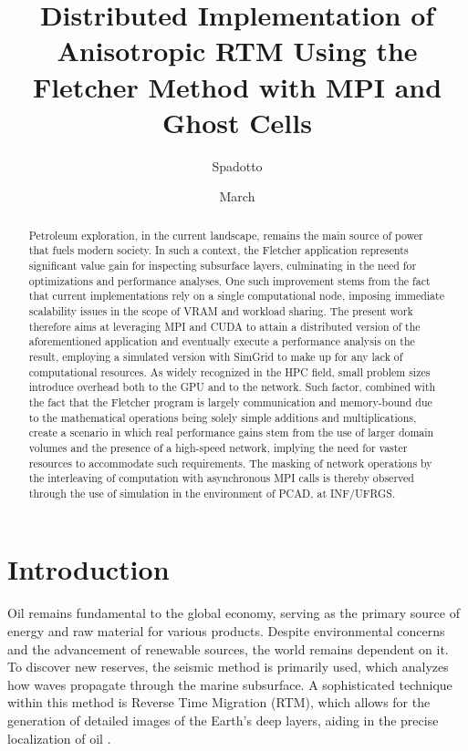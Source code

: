 \documentclass[cic,tc,english]{infufrgs}
\title{Distributed Implementation of Anisotropic RTM Using the
Fletcher Method with MPI and Ghost Cells}
\author{Spadotto}{Vinícius Daniel}
\date{March}{2026}
\begin{document}
\maketitle
\begin{abstract}
  Petroleum exploration, in the current landscape, remains the main source of
  power that fuels modern society. In such a context, the Fletcher application
  represents significant value gain for inspecting subsurface layers,
  culminating
  in the need for optimizations and performance analyses. One such improvement
  stems from the fact that current implementations rely on a single
  computational
  node, imposing immediate scalability issues in the scope of VRAM and workload
  sharing. The present work therefore aims at leveraging MPI and CUDA to
  attain a distributed version of the aforementioned application and eventually
  execute a performance analysis on the result, employing a simulated
  version with
  SimGrid to make up for any lack of computational resources. As
  widely recognized
  in the HPC field, small problem sizes introduce overhead both to
  the GPU and to
  the network. Such factor, combined with the fact that the Fletcher program
  is largely communication and memory-bound due to the mathematical operations
  being solely simple additions and multiplications, create a
  scenario in which real performance gains stem from the use of larger
  domain volumes and the presence of a high-speed network,
  implying the need for vaster resources to accommodate such
  requirements. The masking of network operations by the interleaving
  of computation with asynchronous MPI calls is thereby observed through
  the use of simulation in the environment of PCAD, at INF/UFRGS.
\end{abstract}
\newpage
\tableofcontents
\newpage
\listoffigures
\newpage
\listoftables
\newpage
\chapter{Introduction}
Oil remains fundamental to the global economy, serving as the
primary source of energy and raw material for various products.
Despite environmental concerns and the advancement of renewable
sources, the world remains dependent on it. To discover new
reserves, the seismic method is primarily used, which analyzes how
waves propagate through the marine subsurface. A sophisticated
technique within this method is Reverse Time Migration (RTM), which
allows for the generation of detailed images of the Earth's deep
layers, aiding in the precise localization of oil \cite{rtm}.
\end{document}
